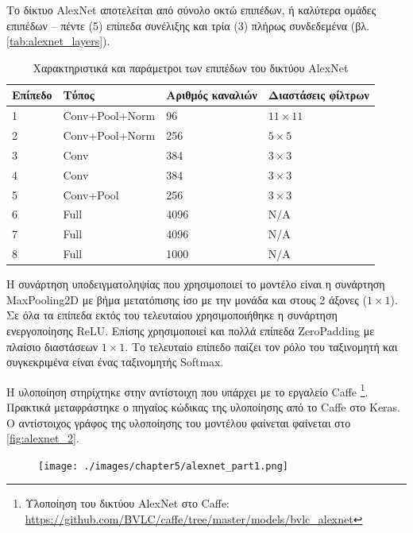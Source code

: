 Το δίκτυο AlexNet αποτελείται από σύνολο οκτώ επιπέδων,
ή καλύτερα ομάδες επιπέδων – πέντε (5) επίπεδα συνέλιξης και τρία (3) πλήρως
συνδεδεμένα (βλ. \autoref{tab:alexnet_layers}).

\begin{table}[H]
  \begin{center}
    \caption{Χαρακτηριστικά και παράμετροι των επιπέδων του δικτύου AlexNet}
    \label{tab:alexnet_layers}
    \begin{tabular}{ | l | l | l | l | }
      \hline
      \rowcolor{Gray}
      Επίπεδο  & Τύπος & Αριθμός καναλιών & Διαστάσεις φίλτρων \\
      \hline
      1 & Conv+Pool+Norm & 96 & $11 \times 11$ \\
      2 & Conv+Pool+Norm & 256 & $5 \times 5$ \\
      3 & Conv & 384 & $3 \times 3$ \\
      4 & Conv & 384 & $3 \times 3$ \\
      5 & Conv+Pool & 256 & $3 \times 3$ \\
      6 & Full & 4096 & Ν/A \\
      7 & Full & 4096 & N/A \\
      8 & Full & 1000 & N/A \\
      \hline
    \end{tabular}
  \end{center}
\end{table}


Η συνάρτηση υποδειγματοληψίας που χρησιμοποιεί το μοντέλο είναι η συνάρτηση
MaxPooling2D με βήμα μετατόπισης ίσο με την μονάδα και στους 2 άξονες ($1 \times 1$).
Σε όλα τα επίπεδα εκτός του τελευταίου χρησιμοποιήθηκε η συνάρτηση ενεργοποίησης
ReLU. Επίσης χρησιμοποιεί και πολλά επίπεδα ZeroPadding με πλαίσιο
διαστάσεων $1 \times 1$. Το τελευταίο επίπεδο παίζει τον ρόλο του ταξινομητή και συγκεκριμένα
είναι ένας ταξινομητής Softmax.

Η υλοποίηση στηρίχτηκε στην αντίστοιχη που υπάρχει με το εργαλείο Caffe
\footnote{Υλοποίηση του δικτύου AlexNet στο Caffe: \url{https://github.com/BVLC/caffe/tree/master/models/bvlc_alexnet}}.
Πρακτικά μεταφράστηκε ο πηγαίος κώδικας της υλοποίησης από το Caffe στο Keras.
Ο αντίστοιχος γράφος της υλοποίησης του μοντέλου
φαίνεται φαίνεται στο \autoref{fig:alexnet_2}.

\newpage

\begin{figure}[H]
  \centering
  \texttt{[image: ./images/chapter5/alexnet\_part1.png]}
\end{figure}


